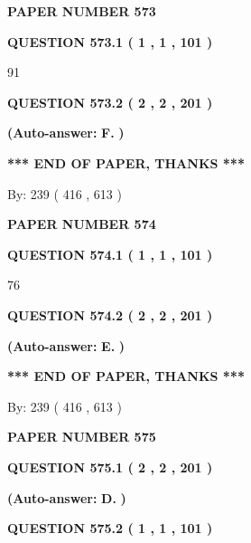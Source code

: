 \documentclass{ctexart}
\begin{document}
   
 {\textbf{ \Large{ PAPER NUMBER  573  }}}
   
   
   
   
  
  
{\textbf{\large{QUESTION
573.1 
 ( 1 , 1 , 101 )
}}}

91
  
  
{\textbf{\large{QUESTION
573.2 
 ( 2 , 2 , 201 )
}}}
 
 
{\textbf{(Auto-answer:}}
{\textbf{\large{
F.}}}
{\textbf{)}}
 
 
   
   
   
   
\vspace{1.0in} 
{\textbf{\large{ *** END OF PAPER, THANKS *** }}} 
   
   
\hspace{1.0in} By: 
 239 ( 416 ,  613 )
   
   
   
   
\newpage 
\setcounter{page}{ 
   574001 } 
   
   
 {\textbf{ \Large{ PAPER NUMBER  574  }}}
   
   
   
   
  
  
{\textbf{\large{QUESTION
574.1 
 ( 1 , 1 , 101 )
}}}

76
  
  
{\textbf{\large{QUESTION
574.2 
 ( 2 , 2 , 201 )
}}}
 
 
{\textbf{(Auto-answer:}}
{\textbf{\large{
E.}}}
{\textbf{)}}
 
 
   
   
   
   
\vspace{1.0in} 
{\textbf{\large{ *** END OF PAPER, THANKS *** }}} 
   
   
\hspace{1.0in} By: 
 239 ( 416 ,  613 )
   
   
   
   
\newpage 
\setcounter{page}{ 
   575001 } 
   
   
 {\textbf{ \Large{ PAPER NUMBER  575  }}}
   
   
   
   
  
  
{\textbf{\large{QUESTION
575.1 
 ( 2 , 2 , 201 )
}}}
 
 
{\textbf{(Auto-answer:}}
{\textbf{\large{
D.}}}
{\textbf{)}}
 
 
  
  
{\textbf{\large{QUESTION
575.2 
 ( 1 , 1 , 101 )
}}}
\end{document}
